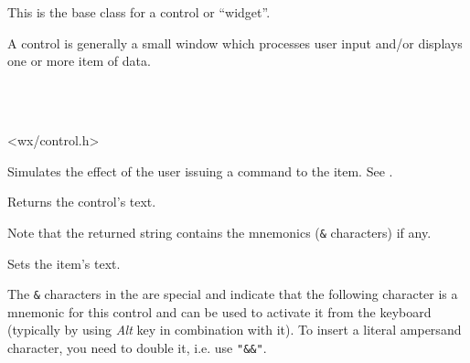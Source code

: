 \section{}\label{wxcontrol}

This is the base class for a control or ``widget''.

A control is generally a small window which processes user input and/or
displays one or more item of data.


\\
\\


<wx/control.h>





\label{wxcontrolcommand}


Simulates the effect of the user issuing a command to the item. See .


\label{wxcontrolgetlabel}


Returns the control's text.

Note that the returned string contains the mnemonics (\texttt{\&} characters) if
any.


\label{wxcontrolsetlabel}


Sets the item's text.

The \texttt{\&} characters in the  are special and indicate that the
following character is a mnemonic for this control and can be used to activate
it from the keyboard (typically by using \textit{Alt} key in combination with
it). To insert a literal ampersand character, you need to double it, i.e. use 
\texttt{"\&\&"}.


